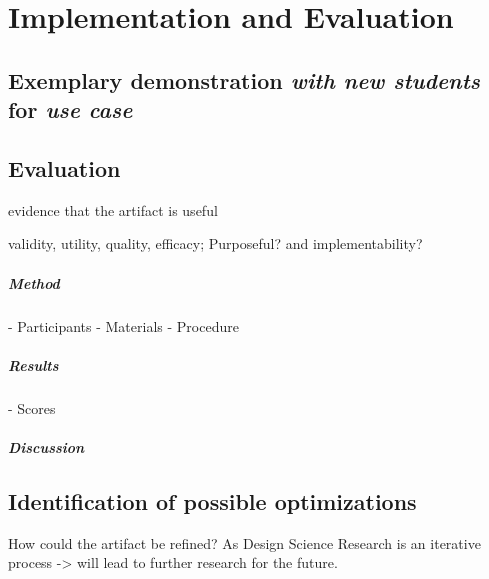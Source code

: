 \chapter{Implementation and Evaluation}

\section{Exemplary demonstration \textit{with new students} for \textit{use case}} \label{sec:demo}

\section{Evaluation}

evidence that the artifact is useful

validity, utility, quality, efficacy; Purposeful? and implementability?

\paragraph{Method}
- Participants
- Materials
- Procedure
\paragraph{Results}
- Scores

\paragraph{Discussion}

\section{Identification of possible optimizations} \label{sec:Optimizations}

How could the artifact be refined? As Design Science Research is an iterative process -> will lead to further research for the future.
